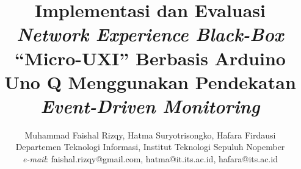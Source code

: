 \title{Implementasi dan Evaluasi \emph{Network Experience Black-Box} ``Micro-UXI'' Berbasis Arduino Uno Q Menggunakan Pendekatan \emph{Event-Driven Monitoring}}

\author{
    Muhammad Faishal Rizqy, Hatma Suryotrisongko, Hafara Firdausi\\
    Departemen Teknologi Informasi, Institut Teknologi Sepuluh Nopember\\
    \emph{e-mail}: faishal.rizqy@gmail.com, hatma@it.its.ac.id, hafara@its.ac.id
}

\maketitle
\thispagestyle{fancy}